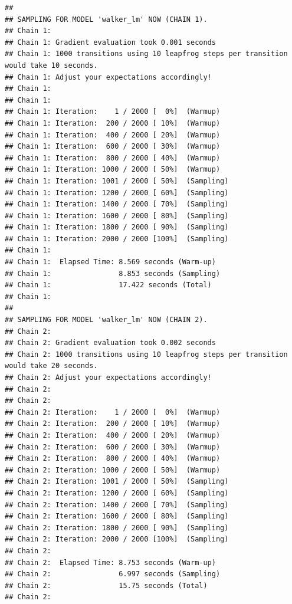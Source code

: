 \documentclass[
]{book}
\newenvironment{Shaded}{\begin{snugshade}}{\end{snugshade}}
\newcommand{\AttributeTok}[1]{\textcolor[rgb]{0.77,0.63,0.00}{#1}}
\newcommand{\CommentTok}[1]{\textcolor[rgb]{0.56,0.35,0.01}{\textit{#1}}}
\newcommand{\FloatTok}[1]{\textcolor[rgb]{0.00,0.00,0.81}{#1}}
\newcommand{\FunctionTok}[1]{\textcolor[rgb]{0.00,0.00,0.00}{#1}}
\newcommand{\NormalTok}[1]{#1}
\newcommand{\SpecialCharTok}[1]{\textcolor[rgb]{0.00,0.00,0.00}{#1}}
\newcommand{\StringTok}[1]{\textcolor[rgb]{0.31,0.60,0.02}{#1}}
\begin{document}
\begin{verbatim}
## 
## SAMPLING FOR MODEL 'walker_lm' NOW (CHAIN 1).
## Chain 1: 
## Chain 1: Gradient evaluation took 0.001 seconds
## Chain 1: 1000 transitions using 10 leapfrog steps per transition would take 10 seconds.
## Chain 1: Adjust your expectations accordingly!
## Chain 1: 
## Chain 1: 
## Chain 1: Iteration:    1 / 2000 [  0%]  (Warmup)
## Chain 1: Iteration:  200 / 2000 [ 10%]  (Warmup)
## Chain 1: Iteration:  400 / 2000 [ 20%]  (Warmup)
## Chain 1: Iteration:  600 / 2000 [ 30%]  (Warmup)
## Chain 1: Iteration:  800 / 2000 [ 40%]  (Warmup)
## Chain 1: Iteration: 1000 / 2000 [ 50%]  (Warmup)
## Chain 1: Iteration: 1001 / 2000 [ 50%]  (Sampling)
## Chain 1: Iteration: 1200 / 2000 [ 60%]  (Sampling)
## Chain 1: Iteration: 1400 / 2000 [ 70%]  (Sampling)
## Chain 1: Iteration: 1600 / 2000 [ 80%]  (Sampling)
## Chain 1: Iteration: 1800 / 2000 [ 90%]  (Sampling)
## Chain 1: Iteration: 2000 / 2000 [100%]  (Sampling)
## Chain 1: 
## Chain 1:  Elapsed Time: 8.569 seconds (Warm-up)
## Chain 1:                8.853 seconds (Sampling)
## Chain 1:                17.422 seconds (Total)
## Chain 1: 
## 
## SAMPLING FOR MODEL 'walker_lm' NOW (CHAIN 2).
## Chain 2: 
## Chain 2: Gradient evaluation took 0.002 seconds
## Chain 2: 1000 transitions using 10 leapfrog steps per transition would take 20 seconds.
## Chain 2: Adjust your expectations accordingly!
## Chain 2: 
## Chain 2: 
## Chain 2: Iteration:    1 / 2000 [  0%]  (Warmup)
## Chain 2: Iteration:  200 / 2000 [ 10%]  (Warmup)
## Chain 2: Iteration:  400 / 2000 [ 20%]  (Warmup)
## Chain 2: Iteration:  600 / 2000 [ 30%]  (Warmup)
## Chain 2: Iteration:  800 / 2000 [ 40%]  (Warmup)
## Chain 2: Iteration: 1000 / 2000 [ 50%]  (Warmup)
## Chain 2: Iteration: 1001 / 2000 [ 50%]  (Sampling)
## Chain 2: Iteration: 1200 / 2000 [ 60%]  (Sampling)
## Chain 2: Iteration: 1400 / 2000 [ 70%]  (Sampling)
## Chain 2: Iteration: 1600 / 2000 [ 80%]  (Sampling)
## Chain 2: Iteration: 1800 / 2000 [ 90%]  (Sampling)
## Chain 2: Iteration: 2000 / 2000 [100%]  (Sampling)
## Chain 2: 
## Chain 2:  Elapsed Time: 8.753 seconds (Warm-up)
## Chain 2:                6.997 seconds (Sampling)
## Chain 2:                15.75 seconds (Total)
## Chain 2:
\end{verbatim}

\begin{Shaded}
\end{Shaded}
\end{document}

